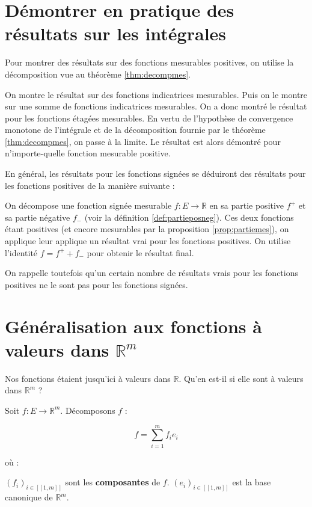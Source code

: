 \documentclass[../integ-proba.tex]{subfiles}
\begin{document}
\section{Démontrer en pratique des résultats sur les intégrales}

Pour montrer des résultats sur des fonctions mesurables positives, on utilise la décomposition vue au théorème \ref{thm:decompmes}.
\begin{itemize}
  \itemb On montre le résultat sur des fonctions indicatrices mesurables.
  \itemb Puis on le montre sur une somme de fonctions indicatrices mesurables. On a donc montré le résultat pour les fonctions étagées mesurables.
  \itemb En vertu de l'hypothèse de convergence monotone de l'intégrale et de la décomposition fournie par le théorème \ref{thm:decompmes}, on passe à la limite.
  Le résultat est alors démontré pour n'importe-quelle fonction mesurable positive.
\end{itemize}

En général, les résultats pour les fonctions signées se déduiront des résultats pour les fonctions positives de la manière suivante :
\begin{itemize}
  \itemb On décompose une fonction signée mesurable $f:E\longrightarrow\mathbb{R}$ en sa partie positive $f^+$ et sa partie négative $f_-$ (voir la définition \ref{def:partieposneg}).
  \itemb Ces deux fonctions étant positives (et encore mesurables par la proposition \ref{prop:partiemes}), on applique leur applique un résultat vrai pour les fonctions positives.
  \itemb On utilise l'identité $f=f^++f_-$ pour obtenir le résultat final.
\end{itemize}

On rappelle toutefois qu'un certain nombre de résultats vrais pour les fonctions positives ne le sont pas pour les fonctions signées.


\section{Généralisation aux fonctions à valeurs dans $\mathbb{R}^m$}

Nos fonctions étaient jusqu'ici à valeurs dans $\mathbb{R}$. Qu'en est-il si elle sont à valeurs dans $\mathbb{R}^m$ ?

Soit $f:E\longrightarrow \mathbb{R}^m$. Décomposons $f$ :

$$
f = \sum_{i=1}^{m}f_ie_i
$$

où :
\begin{itemize}
  \itemb $\left(f_i\right)_{i\in[\![1,m]\!]}$ sont les \textbf{composantes} de $f$.
  \itemb $\left(e_i\right)_{i\in[\![1,m]\!]}$ est la base canonique de $\mathbb{R}^m$.
\end{itemize}
\end{document}
